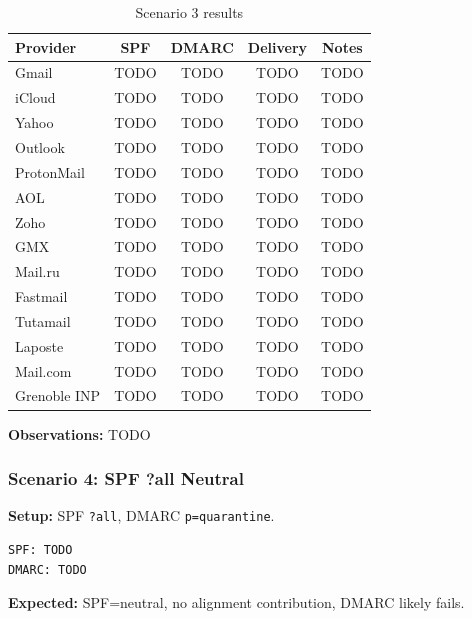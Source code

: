 \documentclass[11pt,a4paper]{article}
\begin{document}
\begin{table}[h]
\centering
\small
\begin{tabular}{lcccc}
\toprule
\textbf{Provider} & \textbf{SPF} & \textbf{DMARC} & \textbf{Delivery} & \textbf{Notes} \\
\midrule
Gmail & TODO & TODO & TODO & TODO \\
iCloud & TODO & TODO & TODO & TODO \\
Yahoo & TODO & TODO & TODO & TODO \\
Outlook & TODO & TODO & TODO & TODO \\
ProtonMail & TODO & TODO & TODO & TODO \\
AOL & TODO & TODO & TODO & TODO \\
Zoho & TODO & TODO & TODO & TODO \\
GMX & TODO & TODO & TODO & TODO \\
Mail.ru & TODO & TODO & TODO & TODO \\
Fastmail & TODO & TODO & TODO & TODO \\
Tutamail & TODO & TODO & TODO & TODO \\
Laposte & TODO & TODO & TODO & TODO \\
Mail.com & TODO & TODO & TODO & TODO \\
Grenoble INP & TODO & TODO & TODO & TODO \\
\bottomrule
\end{tabular}
\caption{Scenario 3 results}
\end{table}

\textbf{Observations:} TODO


\subsubsection{Scenario 4: SPF ?all Neutral}

\textbf{Setup:} SPF \texttt{?all}, DMARC \texttt{p=quarantine}.

\begin{lstlisting}
SPF: TODO
DMARC: TODO
\end{lstlisting}

\textbf{Expected:} SPF=neutral, no alignment contribution, DMARC likely fails.
\end{document}
